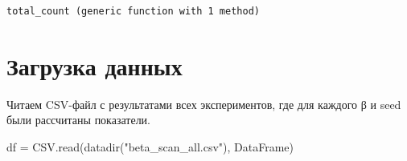\documentclass[
  12pt,
  a4paper,
  DIV=11,
  numbers=noendperiod]{scrreprt}
\newenvironment{Shaded}{\begin{snugshade}}{\end{snugshade}}
\newcommand{\FunctionTok}[1]{\textcolor[rgb]{0.28,0.35,0.67}{#1}}
\newcommand{\NormalTok}[1]{\textcolor[rgb]{0.00,0.23,0.31}{#1}}
\newcommand{\OperatorTok}[1]{\textcolor[rgb]{0.37,0.37,0.37}{#1}}
\newcommand{\StringTok}[1]{\textcolor[rgb]{0.13,0.47,0.30}{#1}}
\begin{document}
\begin{verbatim}
total_count (generic function with 1 method)
\end{verbatim}

\section{Загрузка
данных}\label{ux437ux430ux433ux440ux443ux437ux43aux430-ux434ux430ux43dux43dux44bux445}

Читаем CSV-файл с результатами всех экспериментов, где для каждого β и
seed были рассчитаны показатели.

\begin{Shaded}
\begin{Highlighting}[]
\NormalTok{df }\OperatorTok{=}\NormalTok{ CSV.}\FunctionTok{read}\NormalTok{(}\FunctionTok{datadir}\NormalTok{(}\StringTok{"beta\_scan\_all.csv"}\NormalTok{), DataFrame)}
\end{Highlighting}
\end{Shaded}
\end{document}
